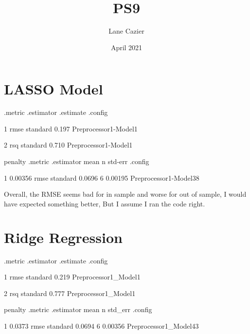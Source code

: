 \documentclass{article}
\title{PS9}
\author{Lane Cazier}
\date{April 2021}
\begin{document}
\maketitle

\section{LASSO Model}
.metric .estimator .estimate .config  

1 rmse    standard       0.197 Preprocessor1-Model1

2 rsq     standard       0.710 Preprocessor1-Model1

penalty .metric .estimator   mean     n std-err .config 
    
1 0.00356 rmse    standard   0.0696     6 0.00195 Preprocessor1-Model38

Overall, the RMSE seems bad for in sample and worse for out of sample, I would have expected something better, But I assume I ran the code right. 
\section{Ridge Regression}
  .metric .estimator .estimate .config             
              
1 rmse    standard       0.219 Preprocessor1_Model1

2 rsq     standard       0.777 Preprocessor1_Model1

  penalty .metric .estimator   mean     n std_err .config              
              
1  0.0373 rmse    standard   0.0694     6 0.00356 Preprocessor1_Model43
\end{document}
